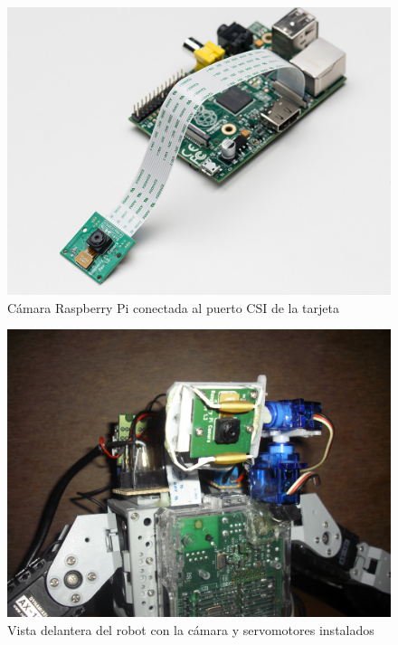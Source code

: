 
\begin{figure}[hbtp]
\centering
\includegraphics[scale=0.6]{imagenes/raspbCam.jpg}
\caption{C\'amara Raspberry Pi conectada al puerto CSI de la tarjeta}
\label{fig:camACSI}
\end{figure}
 
\begin{figure}[hbtp]
\centering
\includegraphics[scale=0.08]{imagenes/servosYcamara.JPG}
\caption{Vista delantera del robot con la cámara y servomotores instalados}
\label{fig:servosycam}
\end{figure}


